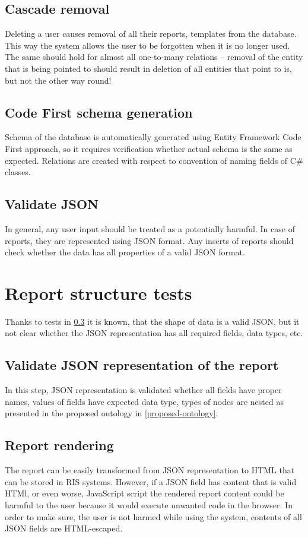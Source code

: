\documentclass[12pt, twoside, openany]{report}
\theoremstyle{definition}
\begin{document}
\subsection{Cascade removal}
	Deleting a user causes removal of all their reports, templates from the database. This way the system allows the user to be forgotten when it is no longer used.
	The same should hold for almost all one-to-many relations – removal of the entity that is being pointed to should result in deletion of all entities that point to is, but not the other way round!

\subsection{Code First schema generation}
	Schema of the database is automatically generated using Entity Framework Code First approach, so it requires verification whether actual schema is the same as expected. 
	Relations are created with respect to convention of naming fields of C\# classes.

\subsection{Validate JSON} \label{valid-json}
	In general, any user input should be treated as a potentially harmful. In case of reports, they are represented using JSON format. Any inserts of reports should check whether the data has all properties of a valid JSON format.
	
\section{Report structure tests}
	Thanks to tests in \ref{valid-json} it is known, that the shape of data is a valid JSON, but it not clear whether the JSON representation has all required fields, data types, etc.

	\subsection{Validate JSON representation of the report}
		In this step, JSON representation is validated whether all fields have proper names, values of fields have expected data type, types of nodes are nested as presented in the proposed ontology in \ref{proposed-ontology}.
	\subsection{Report rendering}
		The report can be easily transformed from JSON representation to HTML that can be stored in RIS systems. However, if a JSON field has content that is valid HTMl, or even worse, JavaScript script the rendered report content could be harmful to the user because it would execute unwanted code in the browser. In order to make sure, the user is not harmed while using the system, contents of all JSON fields are HTML-escaped.
\end{document}
